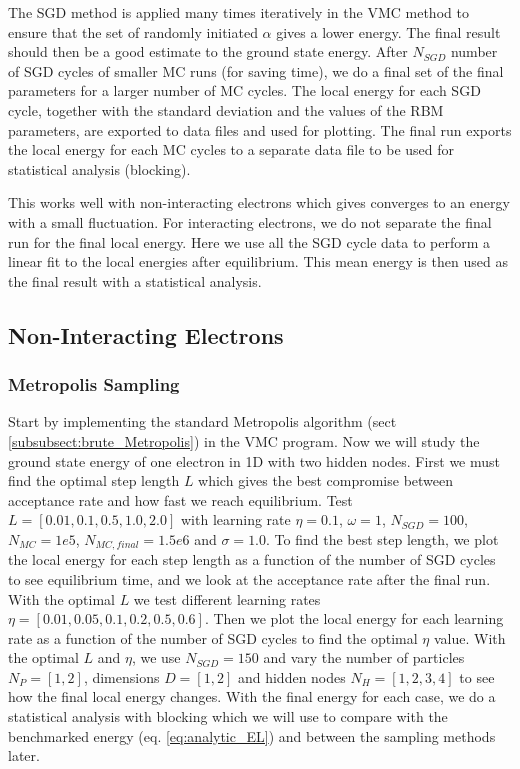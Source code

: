 \documentclass[12pt,a4paper,english]{article}
\begin{document}
The SGD method is applied many times iteratively in the VMC method to ensure that the set of randomly initiated $\alpha$ gives a lower energy. The final result should then be a good estimate to the ground state energy. After $N_{SGD}$ number of SGD cycles of smaller MC runs (for saving time), we do a final set of the final parameters for a larger number of MC cycles. The local energy for each SGD cycle, together with the standard deviation and the values of the RBM parameters, are exported to data files and used for plotting. The final run exports the local energy for each MC cycles to a separate data file to be used for statistical analysis (blocking). 

This works well with non-interacting electrons which gives converges to an energy with a small fluctuation. For interacting electrons, we do not separate the final run for the final local energy. Here we use all the SGD cycle data to perform a linear fit to the local energies after equilibrium. This mean energy is then used as the final result with a statistical analysis.

\subsection{Non-Interacting Electrons}
\label{subsect:Method_nonint}
\subsubsection{Metropolis Sampling}
\label{subsubsect:Method_Nonint_Metropolis}
Start by implementing the standard Metropolis algorithm (sect \ref{subsubsect:brute_Metropolis}) in the VMC program. Now we will study the ground state energy of one electron in 1D with two hidden nodes. First we must find the optimal step length $L$ which gives the best compromise between acceptance rate and how fast we reach equilibrium. Test $L=[0.01,0.1,0.5,1.0,2.0]$ with learning rate $\eta=0.1$, $\omega=1$, $N_{SGD}=100$, $N_{MC}=1e5$, $N_{MC,final}=1.5e6$ and $\sigma=1.0$. To find the best step length, we plot the local energy for each step length as a function of the number of SGD cycles to see equilibrium time, and we look at the acceptance rate after the final run. With the optimal $L$ we test different learning rates $\eta=[0.01,0.05,0.1,0.2,0.5,0.6]$. Then we plot the local energy for each learning rate as a function of the number of SGD cycles to find the optimal $\eta$ value. With the optimal $L$ and $\eta$, we use $N_{SGD}=150$ and vary the number of particles $N_P=[1,2]$, dimensions $D=[1,2]$ and hidden nodes $N_H=[1,2,3,4]$ to see how the final local energy changes. With the final energy for each case, we do a statistical analysis with blocking which we will use to compare with the benchmarked energy (eq. \ref{eq:analytic_EL}) and between the sampling methods later.
\end{document}
